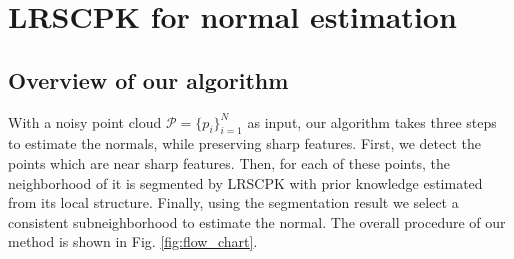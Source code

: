 \section{LRSCPK for normal estimation}
\label{sec:algorithm}
\subsection{Overview of our algorithm}
{\label{sec:overview}}
With a noisy point cloud $\mathcal{P}=\{p_{i}\}_{i=1}^{N}$ as input, our algorithm takes three steps to estimate the normals, while preserving sharp features. First, we detect the points which are near sharp features. Then, for each of these points, the neighborhood of it is segmented by LRSCPK with prior knowledge estimated from its local structure. Finally, using the segmentation result we select a consistent subneighborhood to estimate the normal. The overall procedure of our method is shown in Fig. \ref{fig:flow_chart}.

%
%

